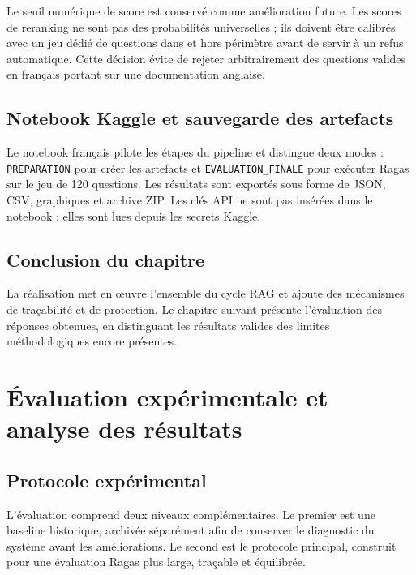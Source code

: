 \documentclass[12pt,a4paper,oneside]{report}
\begin{document}
Le seuil numérique de score est conservé comme amélioration future. Les scores
de reranking ne sont pas des probabilités universelles ; ils doivent être
calibrés avec un jeu dédié de questions dans et hors périmètre avant de servir
à un refus automatique. Cette décision évite de rejeter arbitrairement des
questions valides en français portant sur une documentation anglaise.

\section{Notebook Kaggle et sauvegarde des artefacts}

Le notebook français pilote les étapes du pipeline et distingue deux modes :
\texttt{PREPARATION} pour créer les artefacts et \texttt{EVALUATION\_FINALE}
pour exécuter Ragas sur le jeu de 120 questions. Les résultats sont exportés
sous forme de JSON, CSV, graphiques et archive ZIP. Les clés API ne sont pas
insérées dans le notebook : elles sont lues depuis les secrets Kaggle.

\section*{Conclusion du chapitre}

La réalisation met en œuvre l'ensemble du cycle RAG et ajoute des mécanismes de
traçabilité et de protection. Le chapitre suivant présente l'évaluation des
réponses obtenues, en distinguant les résultats valides des limites
méthodologiques encore présentes.

\chapter{Évaluation expérimentale et analyse des résultats}
\label{chap:evaluation}

\section{Protocole expérimental}

L'évaluation comprend deux niveaux complémentaires. Le premier est une baseline
historique, archivée séparément afin de conserver le diagnostic du système avant
les améliorations. Le second est le protocole principal, construit pour une
évaluation Ragas plus large, traçable et équilibrée.
\end{document}
